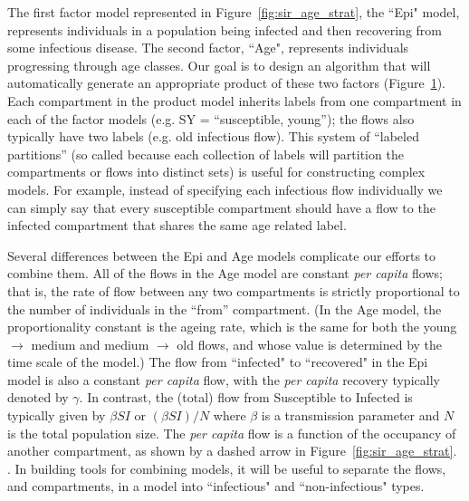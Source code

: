\begin{figure}
    \centering
    
    \caption{}
    \label{fig:simple_sir_age}
\end{figure}

The first factor model represented in Figure~\ref{fig:sir_age_strat}, the ``Epi" model, represents individuals in a population being infected and then recovering from some infectious disease. The second factor, ``Age", represents individuals progressing through age classes. Our goal is to design an algorithm that will automatically generate an appropriate product of these two factors (Figure~\ref{fig:simple_sir_age}). Each compartment in the product model inherits labels from one compartment in each of the factor models (e.g. SY = ``susceptible, young''); the flows also typically have two labels (e.g. old infectious flow).  This system of ``labeled partitions'' (so called because each collection of labels will partition the compartments or flows into distinct sets) is useful for constructing complex models. For example, instead of specifying each infectious flow individually we can simply say that every susceptible compartment should have a flow to the infected compartment that shares the same age related label. 

Several differences between the Epi and Age models complicate our efforts to combine them. 
All of the flows in the Age model are constant \emph{per capita} flows; that is, the rate of flow between any two compartments is strictly proportional to the number of individuals in the ``from'' compartment. (In the Age model, the proportionality constant is the ageing rate, which is the same for both the young $\to$ medium and medium $\to$ old flows, and whose value is determined by the time scale of the model.)
The flow from ``infected" to ``recovered" in the Epi model is also a constant \emph{per capita} flow, with the \emph{per capita} recovery typically denoted by $\gamma$. In contrast, the (total) flow from Susceptible to Infected is typically given by $\beta SI$ or $(\beta S I)/N$ where $\beta$ is a transmission parameter and $N$ is the total population size. The \emph{per capita} flow is a function of the occupancy of another compartment, as shown by a dashed arrow in Figure~\ref{fig:sir_age_strat}. . In building tools for combining models, it will be useful to separate the flows, and compartments, in a model into ``infectious" and ``non-infectious" types.

